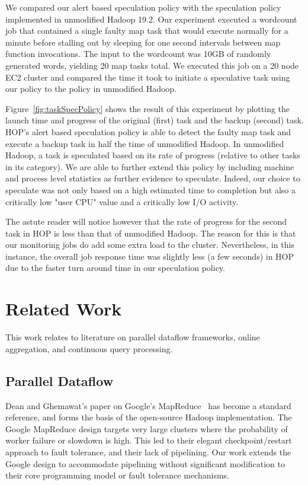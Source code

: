 We compared our alert based speculation policy with the speculation policy implemented in unmodified Hadoop 19.2.
Our experiment executed a wordcount job that contained a single faulty map task that would execute normally for
a minute before stalling out by sleeping for one second intervals between map function invocations. The input to the
wordcount was 10GB of randomly generated words, yielding 20 map tasks total. We executed this job on a 20 node
EC2 cluster and compared the time it took to initiate a speculative task using our policy to the policy in unmodified Hadoop.

Figure~\ref{fig:taskSpecPolicy} shows the result of this experiment by plotting the launch time and progress of the original (first) task 
and the backup (second) task. HOP's alert based speculation policy is able to detect the faulty map task and execute a backup task 
in half the time of unmodified Hadoop. In unmodified Hadoop, a task is speculated based on its rate of progress 
(relative to other tasks in its category). We are able to further extend this policy by including machine and process 
level statistics as further evidence to speculate. Indeed, our choice to speculate was not only based on a high 
estimated time to completion but also a critically low "user CPU" value and a critically low I/O activity. 

The astute reader will notice however that the rate of progress for the second task in HOP is less than that 
of unmodified Hadoop. The reason for this is that our monitoring jobs do add some extra load to the cluster. 
Nevertheless, in this instance, the overall job response time was slightly less (a few seconds) in HOP due to 
the faster turn around time in our speculation policy.


\section{Related Work}
\label{ch:hop:sec:relwork}
This work relates to literature on parallel dataflow frameworks, online aggregation, and continuous query processing.

\subsection{Parallel Dataflow}
Dean and Ghemawat's paper on Google's MapReduce~\cite{mapreduce-osdi}
has become a standard reference, and forms the basis of the
open-source Hadoop implementation.  The Google MapReduce design targets very
large clusters where the probability of worker failure or slowdown is
high.  This led to their elegant checkpoint/restart approach to fault
tolerance, and their lack of pipelining.  Our work
extends the Google design to accommodate pipelining without significant
modification to their core programming model or fault tolerance
mechanisms.

